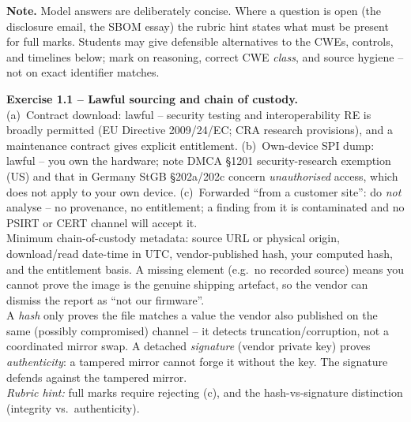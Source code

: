 \documentclass[11pt,a4paper]{article}
\begin{document}
\sheetheader

\noindent
\textbf{Note.} Model answers are deliberately concise. Where a question is open (the disclosure
email, the SBOM essay) the rubric hint states what must be present for full marks. Students may
give defensible alternatives to the CWEs, controls, and timelines below; mark on reasoning,
correct CWE \emph{class}, and source hygiene -- not on exact identifier matches.

\begin{solutionbox}
\textbf{Exercise 1.1 -- Lawful sourcing and chain of custody.}\\[2pt]
(a)~Contract download: lawful -- security testing and interoperability RE is broadly permitted
(EU Directive 2009/24/EC; CRA research provisions), and a maintenance contract gives explicit
entitlement. (b)~Own-device SPI dump: lawful -- you own the hardware; note DMCA \S1201
security-research exemption (US) and that in Germany StGB \S202a/202c concern \emph{unauthorised}
access, which does not apply to your own device. (c)~Forwarded ``from a customer site'': do
\emph{not} analyse -- no provenance, no entitlement; a finding from it is contaminated and no
PSIRT or CERT channel will accept it.\\[2pt]
Minimum chain-of-custody metadata: source URL or physical origin, download/read date-time in
UTC, vendor-published hash, your computed hash, and the entitlement basis. A missing element
(e.g.\ no recorded source) means you cannot prove the image is the genuine shipping artefact, so
the vendor can dismiss the report as ``not our firmware''.\\[2pt]
A \emph{hash} only proves the file matches a value the vendor also published on the same
(possibly compromised) channel -- it detects truncation/corruption, not a coordinated mirror
swap. A detached \emph{signature} (vendor private key) proves \emph{authenticity}: a tampered
mirror cannot forge it without the key. The signature defends against the tampered mirror.\\[2pt]
\emph{Rubric hint:} full marks require rejecting (c), and the hash-vs-signature distinction
(integrity vs.\ authenticity).
\end{solutionbox}
\end{document}
